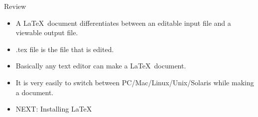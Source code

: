 \documentclass[pdf]{prosper}
\begin{document}
\begin{slide}{Review}
	\begin{itemize}
		\item A \LaTeX\ document differentiates between an editable input file and a viewable output file.
		\item .tex file is the file that is edited.
		\item Basically any text editor can make a \LaTeX\ document.
		\item It is very easily to switch between PC/Mac/Linux/Unix/Solaris while making a document.
		\item NEXT: Installing \LaTeX\
	\end{itemize}
\end{slide}
\end{document}
